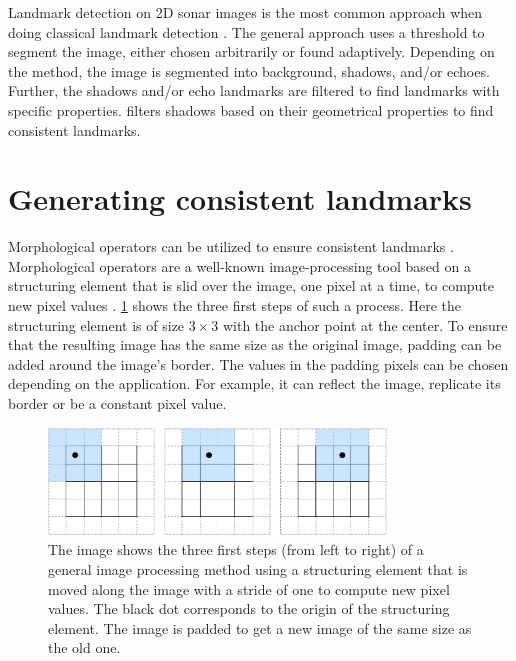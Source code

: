 Landmark detection on 2D sonar images is the most common approach when doing classical landmark detection \cite{Wang2017UnderwaterSonar, Siantidis2016SideVehicles, Yuan2016AnNavigation, Leblond2019SonarProject}. The general approach uses a threshold to segment the image, either chosen arbitrarily or found adaptively. Depending on the method, the image is segmented into background, shadows, and/or echoes. Further, the shadows and/or echo landmarks are filtered to find landmarks with specific properties. \cite{Leblond2019SonarProject} filters shadows based on their geometrical properties to find consistent landmarks. 

\section{Generating consistent landmarks}

Morphological operators can be utilized to ensure consistent landmarks \cite{Yuan2016AnNavigation}. Morphological operators are a well-known image-processing tool based on a structuring element that is slid over the image, one pixel at a time, to compute new pixel values \cite{Gonzalez2018DigitalProcessing}. \cref{fig:image_processing_basics} shows the three first steps of such a process. Here the structuring element is of size $3\times3$ with the anchor point at the center. To ensure that the resulting image has the same size as the original image, padding can be added around the image's border. The values in the padding pixels can be chosen depending on the application. For example, it can reflect the image, replicate its border or be a constant pixel value.  

\begin{figure}
    \centering
    \includegraphics[width=0.8\textwidth]{figures/Image_processing_essentials.drawio.pdf}
    \caption{The image shows the three first steps (from left to right) of a general image processing method using a structuring element that is moved along the image with a stride of one to compute new pixel values. The black dot corresponds to the origin of the structuring element. The image is padded to get a new image of the same size as the old one.}
    \label{fig:image_processing_basics}
\end{figure}

